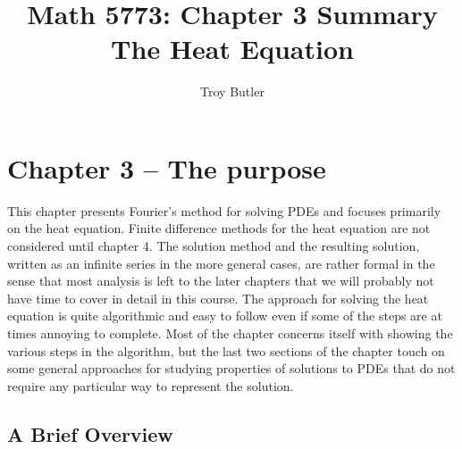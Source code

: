 \documentclass{amsart}
\theoremstyle{plain}
\theoremstyle{definition}
\theoremstyle{remark}
\theoremstyle{definition}
\numberwithin{equation}{section}
\numberwithin{equation}{section}
\begin{document}
\title{Math 5773: Chapter 3 Summary\\ The Heat Equation}
\author{Troy Butler}

\maketitle


\setcounter{section}{3}
\section*{Chapter 3 -- The purpose}

This chapter presents Fourier's method for solving PDEs and focuses primarily on the heat equation.
Finite difference methods for the heat equation are not considered until chapter 4.
The solution method and the resulting solution, written as an infinite series in the more general cases, are rather formal in the sense that most analysis is left to the later chapters that we will probably not have time to cover in detail in this course.
The approach for solving the heat equation is quite algorithmic and easy to follow even if some of the steps are at times annoying to complete. 
Most of the chapter concerns itself with showing the various steps in the algorithm, but the last two sections of the chapter touch on some general approaches for studying properties of solutions to PDEs that do not require any particular way to represent the solution.

\subsection{A Brief Overview}
\end{document}
